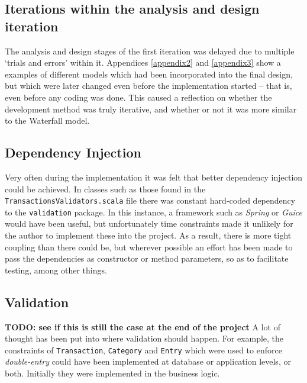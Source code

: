 \subsection{Iterations within the analysis and design iteration}
The analysis and design stages of the first iteration was delayed due to
multiple `trials and errors' within it. Appendices \ref{appendix2} and
\ref{appendix3} show a examples of different models which had been incorporated
into the final design, but which were later changed even before the
implementation started -- that is, even before any coding was done. This caused
a reflection on whether the development method was truly iterative, and whether
or not it was more similar to the Waterfall model.

\subsection{Dependency Injection} \label{sec:Reflections.DependencyInjection}
Very often during the implementation it was felt that better dependency
injection could be achieved. In classes such as those found in the
\texttt{TransactionsValidators.scala} file there was constant hard-coded
dependency to the \texttt{validation} package. In this instance, a framework
such as \emph{Spring} or \emph{Guice} would have been useful, but unfortunately
time constraints made it unlikely for the author to implement these into the
project. As a result, there is more tight coupling than there could be, but
wherever possible an effort has been made to pass the dependencies as
constructor or method parameters, so as to facilitate testing, among other
things.

\subsection{Validation} \label{sec:Reflections.Validation} 
\textbf{TODO: see if this is still the case at the end of the project}
A lot of thought has been put into where validation should happen. For example,
the constraints of \texttt{Transaction}, \texttt{Category} and \texttt{Entry}
which were used to enforce \emph{double-entry} could have been implemented at
database or application levels, or both. Initially they were implemented in the
business logic.
